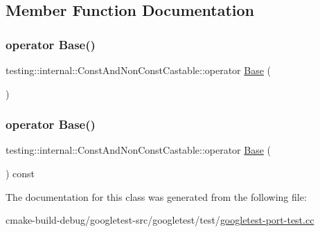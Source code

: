 \subsection{Member Function Documentation}
\mbox{\label{classtesting_1_1internal_1_1ConstAndNonConstCastable_aff0c372d429d76d002bb29f83f2429fa}} 
\subsubsection{\texorpdfstring{operator Base()}{operator Base()}\hspace{0.1cm}{\footnotesize\ttfamily [1/2]}}
{\footnotesize\ttfamily testing\+::internal\+::\+Const\+And\+Non\+Const\+Castable\+::operator \mbox{\hyperlink{classBase}{Base}} (\begin{DoxyParamCaption}{ }\end{DoxyParamCaption})\hspace{0.3cm}{\ttfamily [inline]}}

\mbox{\label{classtesting_1_1internal_1_1ConstAndNonConstCastable_a4e8ee8051162f1dfc1da294c71481e2f}} 
\subsubsection{\texorpdfstring{operator Base()}{operator Base()}\hspace{0.1cm}{\footnotesize\ttfamily [2/2]}}
{\footnotesize\ttfamily testing\+::internal\+::\+Const\+And\+Non\+Const\+Castable\+::operator \mbox{\hyperlink{classBase}{Base}} (\begin{DoxyParamCaption}{ }\end{DoxyParamCaption}) const\hspace{0.3cm}{\ttfamily [inline]}}



The documentation for this class was generated from the following file\+:\begin{DoxyCompactItemize}
\item 
cmake-\/build-\/debug/googletest-\/src/googletest/test/\mbox{\hyperlink{googletest-port-test_8cc}{googletest-\/port-\/test.\+cc}}\end{DoxyCompactItemize}

